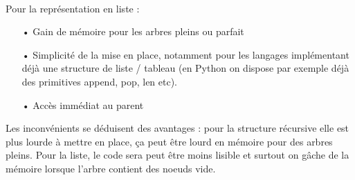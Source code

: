 \documentclass{article}
\begin{document}
\paragraph*{}
Pour la représentation en liste :
\begin{itemize}
\item[•]
Gain de mémoire pour les arbres pleins ou parfait
\item[•]
Simplicité de la mise en place, notamment pour les langages implémentant déjà une structure de liste / tableau (en Python on dispose par exemple déjà des primitives append, pop, len etc).
\item[•]
Accès immédiat au parent
\end{itemize}
Les inconvénients se déduisent des avantages : pour la structure récursive elle est plus lourde à mettre en place, ça peut être lourd en mémoire pour des arbres pleins.
Pour la liste, le code sera peut être moins lisible et surtout on gâche de la mémoire lorsque l'arbre contient des noeuds vide. 
\end{document}
